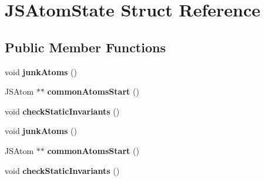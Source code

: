 \hypertarget{struct_j_s_atom_state}{\section{J\-S\-Atom\-State Struct Reference}
\label{struct_j_s_atom_state}
}
\subsection*{Public Member Functions}
\begin{DoxyCompactItemize}
\item 
\hypertarget{struct_j_s_atom_state_ab2bdcfe3c7e5e34554a0c138b3de2a76}{void {\bfseries junk\-Atoms} ()}\label{struct_j_s_atom_state_ab2bdcfe3c7e5e34554a0c138b3de2a76}

\item 
\hypertarget{struct_j_s_atom_state_a5d9efc8cf99921fbb0fe59911eb95bf0}{J\-S\-Atom $\ast$$\ast$ {\bfseries common\-Atoms\-Start} ()}\label{struct_j_s_atom_state_a5d9efc8cf99921fbb0fe59911eb95bf0}

\item 
\hypertarget{struct_j_s_atom_state_a15446e68c28be32cc3ca3ce0dafae6c2}{void {\bfseries check\-Static\-Invariants} ()}\label{struct_j_s_atom_state_a15446e68c28be32cc3ca3ce0dafae6c2}

\item 
\hypertarget{struct_j_s_atom_state_ab2bdcfe3c7e5e34554a0c138b3de2a76}{void {\bfseries junk\-Atoms} ()}\label{struct_j_s_atom_state_ab2bdcfe3c7e5e34554a0c138b3de2a76}

\item 
\hypertarget{struct_j_s_atom_state_a5d9efc8cf99921fbb0fe59911eb95bf0}{J\-S\-Atom $\ast$$\ast$ {\bfseries common\-Atoms\-Start} ()}\label{struct_j_s_atom_state_a5d9efc8cf99921fbb0fe59911eb95bf0}

\item 
\hypertarget{struct_j_s_atom_state_a15446e68c28be32cc3ca3ce0dafae6c2}{void {\bfseries check\-Static\-Invariants} ()}\label{struct_j_s_atom_state_a15446e68c28be32cc3ca3ce0dafae6c2}

\end{DoxyCompactItemize}
